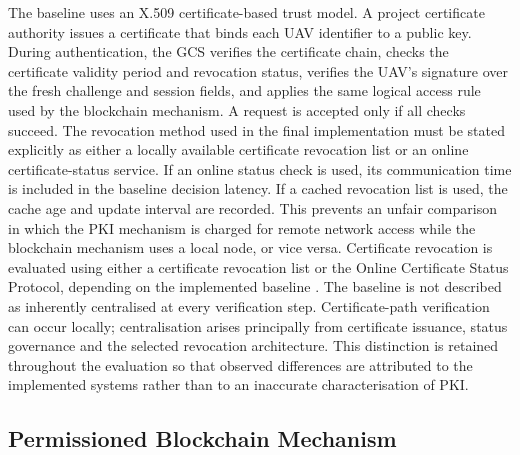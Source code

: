 The baseline uses an X.509 certificate-based trust model. A project certificate authority issues a certificate that binds each UAV identifier to a public key\cite{RFC5280}. During authentication, the GCS verifies the certificate chain, checks the certificate validity period and revocation status, verifies the UAV's signature over the fresh challenge and session fields, and applies the same logical access rule used by the blockchain mechanism. A request is accepted only if all checks succeed.
\noindent
The revocation method used in the final implementation must be stated explicitly as either a locally available certificate revocation list or an online certificate-status service. If an online status check is used, its communication time is included in the baseline decision latency. If a cached revocation list is used, the cache age and update interval are recorded. This prevents an unfair comparison in which the PKI mechanism is charged for remote network access while the blockchain mechanism uses a local node, or vice versa. Certificate revocation is evaluated using either a certificate revocation list or the Online Certificate Status Protocol, depending on
the implemented baseline \cite{RFC5280,RFC6960}.
\noindent
The baseline is not described as inherently centralised at every verification step. Certificate-path verification can occur locally; centralisation arises principally from certificate issuance, status governance and the selected revocation architecture. This distinction is retained throughout the evaluation so that observed differences are attributed to the implemented systems rather than to an inaccurate characterisation of PKI.

\subsection{Permissioned Blockchain Mechanism}
\label{subsec:blockchain-mechanism}


